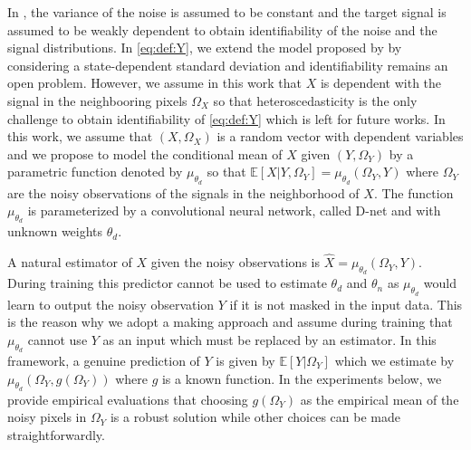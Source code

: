 \documentclass{article}
\begin{document}
In \cite{gassiat:lecorff:lehericy:2021}, the variance of the noise is assumed to be constant and the target signal is assumed to be weakly dependent to obtain identifiability of the noise and the signal  distributions. %
In \eqref{eq:def:Y}, we extend the model  proposed by \cite{gassiat:lecorff:lehericy:2021} by considering a state-dependent standard deviation and identifiability remains an open problem. However, we assume in this work that $X$ is dependent with the signal in the neighbooring pixels $\Omega_X$ so that heteroscedasticity is the only challenge to obtain identifiability of \eqref{eq:def:Y} which is left for future works.
In this work, we assume that $(X,\Omega_X)$ is a random vector with dependent variables and we propose to model the conditional mean of $X$ given $(Y,\Omega_Y)$ by a parametric function denoted by $\mu_{\theta_d}$ so that $\mathbb{E}[X|Y,\Omega_Y] = \mu_{\theta_d}(\Omega_Y,Y)$ where $\Omega_Y$ are the noisy observations of the signals in the neighborhood of $X$. The function $ \mu_{\theta_d}$ is parameterized by a convolutional neural network, called D-net and with unknown weights $\theta_d$.

A natural estimator of $X$ given the noisy observations is $\widehat X = \mu_{\theta_d}(\Omega_Y,Y)$.
During training this predictor cannot be used to estimate $\theta_d$ and $\theta_n$ as $\mu_{\theta_d}$ would learn to output the noisy observation $Y$ if it is not masked in the input data.
This is the reason why we adopt a making approach and assume during training that $\mu_{\theta_d}$ cannot use $Y$ as an input which must be replaced by an estimator.
In this framework, a genuine prediction of $Y$ is given by $\mathbb{E}[Y|\Omega_Y]$ which we estimate by $\mu_{\theta_d}(\Omega_Y,g(\Omega_Y))$ where $g$ is a known function. %
In the experiments below, we provide empirical evaluations that choosing $g(\Omega_Y)$ as the empirical mean of the noisy pixels in $\Omega_Y$ is a robust solution while other choices can be made straightforwardly.
\end{document}
